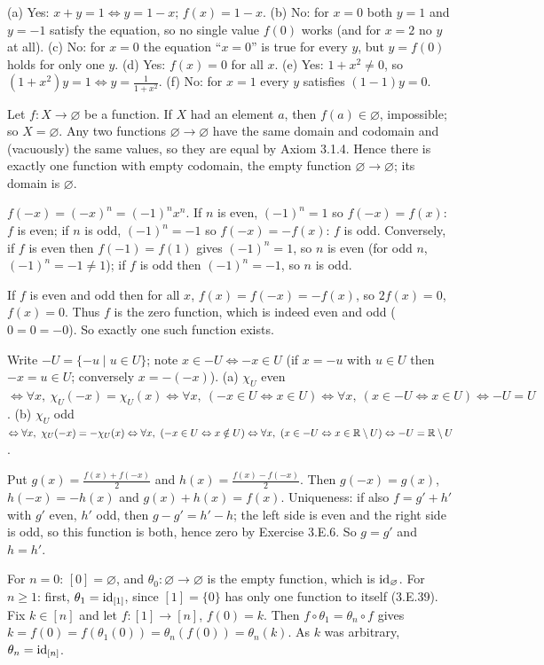  (a) Yes: $x+y=1\Leftrightarrow y=1-x$; $f(x)=1-x$. (b) No: for $x=0$ both $y=1$ and $y=-1$ satisfy the equation, so no single value $f(0)$ works (and for $x=2$ no $y$ at all). (c) No: for $x=0$ the equation ``$x=0$'' is true for every $y$, but $y=f(0)$ holds for only one $y$. (d) Yes: $f(x)=0$ for all $x$. (e) Yes: $1+x^2\ne0$, so $(1+x^2)y=1\Leftrightarrow y=\frac1{1+x^2}$. (f) No: for $x=1$ every $y$ satisfies $(1-1)y=0$.

 Let $f:X\to\varnothing$ be a function. If $X$ had an element $a$, then $f(a)\in\varnothing$, impossible; so $X=\varnothing$. Any two functions $\varnothing\to\varnothing$ have the same domain and codomain and (vacuously) the same values, so they are equal by Axiom 3.1.4. Hence there is exactly one function with empty codomain, the empty function $\varnothing\to\varnothing$; its domain is $\varnothing$.

 $f(-x)=(-x)^n=(-1)^nx^n$. If $n$ is even, $(-1)^n=1$ so $f(-x)=f(x)$: $f$ is even; if $n$ is odd, $(-1)^n=-1$ so $f(-x)=-f(x)$: $f$ is odd. Conversely, if $f$ is even then $f(-1)=f(1)$ gives $(-1)^n=1$, so $n$ is even (for odd $n$, $(-1)^n=-1\ne1$); if $f$ is odd then $(-1)^n=-1$, so $n$ is odd.

 If $f$ is even and odd then for all $x$, $f(x)=f(-x)=-f(x)$, so $2f(x)=0$, $f(x)=0$. Thus $f$ is the zero function, which is indeed even and odd ($0=0=-0$). So exactly one such function exists.

 Write $-U=\{-u\mid u\in U\}$; note $x\in-U\Leftrightarrow-x\in U$ (if $x=-u$ with $u\in U$ then $-x=u\in U$; conversely $x=-(-x)$). (a) $\chi_U$ even $\Leftrightarrow\forall x,\ \chi_U(-x)=\chi_U(x)\Leftrightarrow\forall x,\ (-x\in U\Leftrightarrow x\in U)\Leftrightarrow\forall x,\ (x\in-U\Leftrightarrow x\in U)\Leftrightarrow-U=U$. (b) $\chi_U$ odd $\Leftrightarrow\forall x,\ \chi_U(-x)=-\chi_U(x)\Leftrightarrow\forall x,\ (-x\in U\Leftrightarrow x\notin U)\Leftrightarrow\forall x,\ (x\in-U\Leftrightarrow x\in\R\setminus U)\Leftrightarrow-U=\R\setminus U$.

 Put $g(x)=\frac{f(x)+f(-x)}2$ and $h(x)=\frac{f(x)-f(-x)}2$. Then $g(-x)=g(x)$, $h(-x)=-h(x)$ and $g(x)+h(x)=f(x)$. Uniqueness: if also $f=g'+h'$ with $g'$ even, $h'$ odd, then $g-g'=h'-h$; the left side is even and the right side is odd, so this function is both, hence zero by Exercise 3.E.6. So $g=g'$ and $h=h'$.

 For $n=0$: $[0]=\varnothing$, and $\theta_0:\varnothing\to\varnothing$ is the empty function, which is $\mathrm{id}_\varnothing$. For $n\ge1$: first, $\theta_1=\mathrm{id}_{[1]}$, since $[1]=\{0\}$ has only one function to itself (3.E.39). Fix $k\in[n]$ and let $f:[1]\to[n]$, $f(0)=k$. Then $f\circ\theta_1=\theta_n\circ f$ gives $k=f(0)=f(\theta_1(0))=\theta_n(f(0))=\theta_n(k)$. As $k$ was arbitrary, $\theta_n=\mathrm{id}_{[n]}$.

